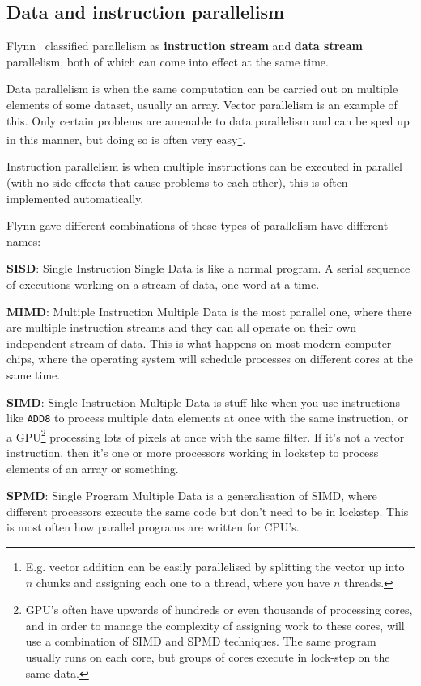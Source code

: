 
\subsection{Data and instruction parallelism}

Flynn~\cite{flynn1972some} classified parallelism as \textbf{instruction stream}
and \textbf{data stream} parallelism, both of which can come into effect at the
same time.

Data parallelism is when the same computation can be carried out on multiple
elements of some dataset, usually an array. Vector parallelism is an example of
this. Only certain problems are amenable to data parallelism and can be sped up
in this manner, but doing so is often very easy\footnote{E.g. vector addition
can be easily parallelised by splitting the vector up into $n$ chunks and
assigning each one to a thread, where you have $n$ threads.}.

Instruction parallelism is when multiple instructions can be executed in
parallel (with no side effects that cause problems to each other), this is often
implemented automatically.

Flynn gave different combinations of these types of parallelism have different
names:

\begin{description}
  \item \textbf{SISD}: Single Instruction Single Data is like a normal program.
  A serial sequence of executions working on a stream of data, one word at a
  time.
  \item \textbf{MIMD}: Multiple Instruction Multiple Data is the most parallel
  one, where there are multiple instruction streams and they can all operate on 
  their own independent stream of data. This is what happens on most modern
  computer chips, where the operating system will schedule processes on
  different cores at the same time.
  \item \textbf{SIMD}: Single Instruction Multiple Data is stuff like when you 
  use instructions like \texttt{ADD8} to process multiple data elements at once 
  with the same instruction, or a GPU\footnote{GPU's often have upwards of
  hundreds or even thousands of processing cores, and in order to manage the
  complexity of assigning work to these cores, will use a combination of SIMD
  and SPMD techniques. The same program usually runs on each core, but groups of
  cores execute in lock-step on the same data.} processing lots of pixels at
  once with the same filter. If it's not a vector instruction, then it's one or
  more processors working in lockstep to process elements of an array or
  something.
  \item \textbf{SPMD}: Single Program Multiple Data is a generalisation of SIMD,
  where different processors execute the same code but don't need to be in 
  lockstep. This is most often how parallel programs are written for CPU's.
\end{description}

